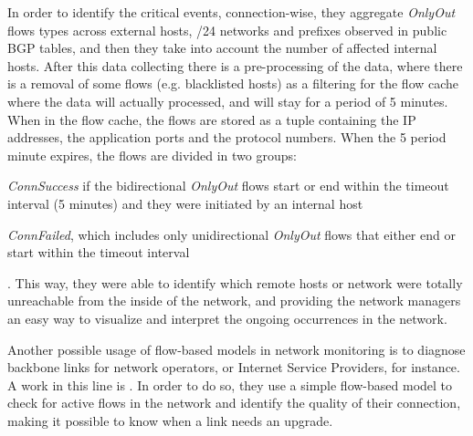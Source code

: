 \documentclass[runningheads,a4paper]{llncs}
\begin{document}
In order to identify the critical events, connection-wise, they aggregate \textit{OnlyOut} flows types across external hosts, /24 networks and prefixes observed in public BGP tables, and then they take into account the number of affected internal hosts. After this data collecting there is a pre-processing of the data, where there is a removal of some flows (e.g. blacklisted hosts) as a filtering for the flow cache where the data will actually processed, and will stay for a period of 5 minutes. When in the flow cache, the flows are stored as a tuple containing the IP addresses, the application ports and the protocol numbers. When the 5 period minute expires, the flows are divided in two groups:
\begin{enumerate*}
\item \textit{ConnSuccess} if the bidirectional \textit{OnlyOut} flows start or end within the timeout interval (5 minutes) and they were initiated by an internal host
\item \textit{ConnFailed}, which includes only unidirectional \textit{OnlyOut} flows that either end or start within the timeout interval
\end{enumerate*}. This way, they were able to identify which remote hosts or network were totally unreachable from the inside of the network, and providing the network managers an easy way to visualize and interpret the ongoing occurrences in the network.


Another possible usage of flow-based models in network monitoring is to diagnose backbone links for network operators, or Internet Service Providers, for instance. A work in this line is \cite{sukhov2009active}. In order to do so, they use a simple flow-based model to check for active flows in the network and identify the quality of their connection, making it possible to know when a link needs an upgrade. 
\end{document}
